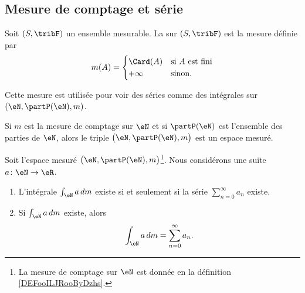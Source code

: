 \subsection{Mesure de comptage et série}

\begin{definition}      \label{DEFooILJRooByDzhs}
	Soit \( (S,\tribF)\) un ensemble mesurable. La  sur \( (S,\tribF)\) est la mesure définie par
	\begin{equation}
		m(A)=\begin{cases}
			\Card(A) & \text{si } A\text{ est fini} \\
			+\infty  & \text{sinon}.
		\end{cases}
	\end{equation}
\end{definition}
Cette mesure est utilisée pour voir des séries comme des intégrales sur \( (\eN,\partP(\eN),m)\).

\begin{lemma}       \label{LEMooDTFHooLVsvAw}
	Si \( m\) est la mesure de comptage sur \( \eN\) et si \( \partP(\eN)\) est l'ensemble des parties de \( \eN\), alors le triple \( \big( \eN,\partP(\eN), m \big)\) est un espace mesuré.
\end{lemma}

\begin{proposition}     \label{PROPooPNQAooDRLcCm}
	Soit l'espace mesuré \( \big( \eN,\partP(\eN), m \big)\)\footnote{La mesure de comptage sur \( \eN\) est donnée en la définition \ref{DEFooILJRooByDzhs}.}. Nous considérons une suite \( a\colon \eN\to \eR\).

	\begin{enumerate}
		\item
		      L'intégrale \( \int_{\eN}a\,dm\) existe si et seulement si la série \( \sum_{n=0}^{\infty}a_n\) existe.
		\item
		      Si \( \int_{\eN}a\,dm\) existe, alors
		      \begin{equation}
			      \int_{\eN}a\,dm=\sum_{n=0}^{\infty}a_n.
		      \end{equation}
	\end{enumerate}
\end{proposition}

